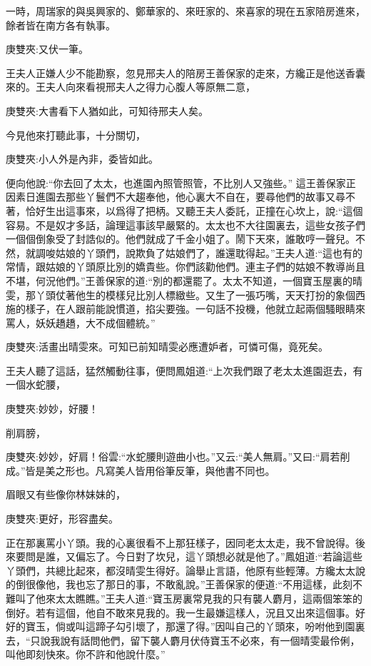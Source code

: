 \begin{parag}
    一時，周瑞家的與吳興家的、鄭華家的、來旺家的、來喜家的現在五家陪房進來，餘者皆在南方各有執事。\begin{note}庚雙夾:又伏一筆。\end{note}王夫人正嫌人少不能勘察，忽見邢夫人的陪房王善保家的走來，方纔正是他送香囊來的。王夫人向來看視邢夫人之得力心腹人等原無二意，\begin{note}庚雙夾:大書看下人猶如此，可知待邢夫人矣。\end{note}今見他來打聽此事，十分關切，\begin{note}庚雙夾:小人外是內非，委皆如此。\end{note}便向他說:“你去回了太太，也進園內照管照管，不比別人又強些。” 這王善保家正因素日進園去那些丫鬟們不大趨奉他，他心裏大不自在，要尋他們的故事又尋不著，恰好生出這事來，以爲得了把柄。又聽王夫人委託，正撞在心坎上，說:“這個容易。不是奴才多話，論理這事該早嚴緊的。太太也不大往園裏去，這些女孩子們一個個倒象受了封誥似的。他們就成了千金小姐了。鬧下天來，誰敢哼一聲兒。不然，就調唆姑娘的丫頭們，說欺負了姑娘們了，誰還耽得起。”王夫人道:“這也有的常情，跟姑娘的丫頭原比別的嬌貴些。你們該勸他們。連主子們的姑娘不教導尚且不堪，何況他們。”王善保家的道:“別的都還罷了。太太不知道，一個寶玉屋裏的晴雯，那丫頭仗著他生的模樣兒比別人標緻些。又生了一張巧嘴，天天打扮的象個西施的樣子，在人跟前能說慣道，掐尖要強。一句話不投機，他就立起兩個騷眼睛來罵人，妖妖趫趫，大不成個體統。”\begin{note}庚雙夾:活畫出晴雯來。可知已前知晴雯必應遭妒者，可憐可傷，竟死矣。\end{note}王夫人聽了這話，猛然觸動往事，便問鳳姐道:“上次我們跟了老太太進園逛去，有一個水蛇腰，\begin{note}庚雙夾:妙妙，好腰！\end{note}削肩膀，\begin{note}庚雙夾:妙妙，好肩！俗雲:“水蛇腰則遊曲小也。”又云:“美人無肩。”又曰:“肩若削成。”皆是美之形也。凡寫美人皆用俗筆反筆，與他書不同也。\end{note}眉眼又有些像你林妹妹的，\begin{note}庚雙夾:更好，形容盡矣。\end{note}正在那裏罵小丫頭。我的心裏很看不上那狂樣子，因同老太太走，我不曾說得。後來要問是誰，又偏忘了。今日對了坎兒，這丫頭想必就是他了。”鳳姐道:“若論這些丫頭們，共總比起來，都沒晴雯生得好。論舉止言語，他原有些輕薄。方纔太太說的倒很像他，我也忘了那日的事，不敢亂說。”王善保家的便道:“不用這樣，此刻不難叫了他來太太瞧瞧。”王夫人道:“寶玉房裏常見我的只有襲人麝月，這兩個笨笨的倒好。若有這個，他自不敢來見我的。我一生最嫌這樣人，況且又出來這個事。好好的寶玉，倘或叫這蹄子勾引壞了，那還了得。”因叫自己的丫頭來，吩咐他到園裏去，“只說我說有話問他們，留下襲人麝月伏侍寶玉不必來，有一個晴雯最伶俐，叫他即刻快來。你不許和他說什麼。”
\end{parag}


